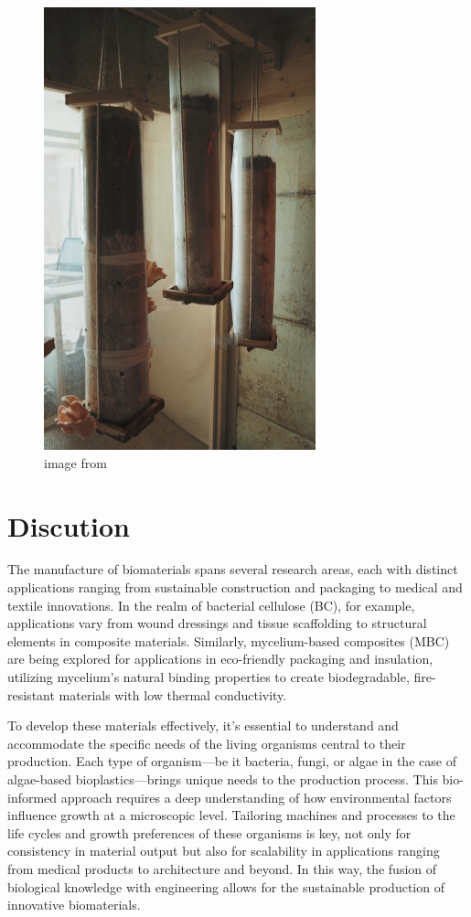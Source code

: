 \begin{figure}[h]
    \centering
    \includegraphics[width=0.7\textwidth]{images/lowtechdouche2.png}
    \caption{image from \cite{lowtechmyco}}
    \label{fig:blasttrash}
\end{figure} 


\section{Discution}

The manufacture of biomaterials spans several research areas, each with distinct applications ranging from sustainable construction and packaging to medical and textile innovations. In the realm of bacterial cellulose (BC), for example, applications vary from wound dressings and tissue scaffolding to structural elements in composite materials. Similarly, mycelium-based composites (MBC) are being explored for applications in eco-friendly packaging and insulation, utilizing mycelium’s natural binding properties to create biodegradable, fire-resistant materials with low thermal conductivity.

To develop these materials effectively, it's essential to understand and accommodate the specific needs of the living organisms central to their production.
Each type of organism—be it bacteria, fungi, or algae in the case of algae-based bioplastics—brings unique needs to the production process. This bio-informed approach requires a deep understanding of how environmental factors influence growth at a microscopic level. Tailoring machines and processes to the life cycles and growth preferences of these organisms is key, not only for consistency in material output but also for scalability in applications ranging from medical products to architecture and beyond. In this way, the fusion of biological knowledge with engineering allows for the sustainable production of innovative biomaterials.

